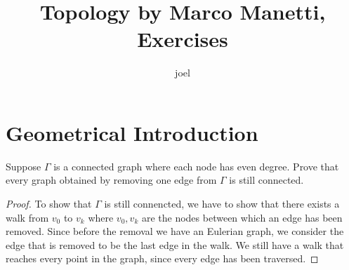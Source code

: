 \documentclass[10pt]{article}
\title{Topology by Marco Manetti, Exercises}
\author{joel}
\date{}
\theoremstyle{definition}
\theoremstyle{remark}
\begin{document}
\maketitle

\section{Geometrical Introduction}

Suppose $\Gamma$ is a connected graph where each node has even degree. Prove
that every graph obtained by removing one edge from $\Gamma$ is still connected.

\begin{proof}
    To show that $\Gamma$ is still connencted, we have to show that there exists 
    a walk from $v_0$ to $v_k$ where $v_0, v_k$ are the nodes between which an 
    edge has been removed. Since before the removal we have an Eulerian graph,
    we consider the edge that is removed to be the last edge in the walk.
    We still have a walk that reaches every point in the graph, since every edge
    has been traversed. 
\end{proof}
\end{document}
